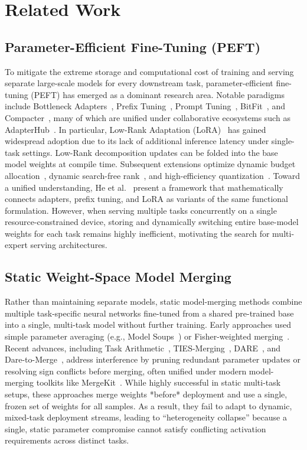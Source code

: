 \section{Related Work}
\label{sec:related_work}

\subsection{Parameter-Efficient Fine-Tuning (PEFT)}
To mitigate the extreme storage and computational cost of training and serving separate large-scale models for every downstream task, parameter-efficient fine-tuning (PEFT) has emerged as a dominant research area. Notable paradigms include Bottleneck Adapters~\cite{houlsby2019parameter}, Prefix Tuning~\cite{li2021prefix}, Prompt Tuning~\cite{lester2021power}, BitFit~\cite{zaken2021bitfit}, and Compacter~\cite{karimi2021compacter}, many of which are unified under collaborative ecosystems such as AdapterHub~\cite{pfeiffer2020adapterhub}. In particular, Low-Rank Adaptation (LoRA)~\cite{hu2021lora} has gained widespread adoption due to its lack of additional inference latency under single-task settings. Low-Rank decomposition updates can be folded into the base model weights at compile time. Subsequent extensions optimize dynamic budget allocation~\cite{zhang2023adalora}, dynamic search-free rank~\cite{valipour2023dylora}, and high-efficiency quantization~\cite{dettmers2023qlora}. Toward a unified understanding, He et al.~\cite{he2021towards} present a framework that mathematically connects adapters, prefix tuning, and LoRA as variants of the same functional formulation. However, when serving multiple tasks concurrently on a single resource-constrained device, storing and dynamically switching entire base-model weights for each task remains highly inefficient, motivating the search for multi-expert serving architectures.

\subsection{Static Weight-Space Model Merging}
Rather than maintaining separate models, static model-merging methods combine multiple task-specific neural networks fine-tuned from a shared pre-trained base into a single, multi-task model without further training. Early approaches used simple parameter averaging (e.g., Model Soups~\cite{wortsman2022model}) or Fisher-weighted merging~\cite{matena2021merging}. Recent advances, including Task Arithmetic~\cite{ilharco2022editing}, TIES-Merging~\cite{yadav2023ties}, DARE~\cite{yu2023language}, and Dare-to-Merge~\cite{yu2023dare}, address interference by pruning redundant parameter updates or resolving sign conflicts before merging, often unified under modern model-merging toolkits like MergeKit~\cite{gallego2024mergekit}. While highly successful in static multi-task setups, these approaches merge weights *before* deployment and use a single, frozen set of weights for all samples. As a result, they fail to adapt to dynamic, mixed-task deployment streams, leading to ``heterogeneity collapse'' because a single, static parameter compromise cannot satisfy conflicting activation requirements across distinct tasks.

